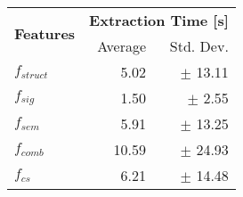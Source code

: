 \begin{tabular}{@{}lrr@{}}
\toprule
\multirow{2}{*}{\textbf{Features}} & \multicolumn{2}{c}{\textbf{Extraction Time [s]}} \\
\cmidrule{2-3}
 & Average & Std. Dev. \\ 
\midrule
$f_{struct}$ & 5.02 & $\pm$ 13.11 \\
$f_{sig}$ & 1.50 & $\pm$ 2.55 \\
$f_{sem}$ & 5.91 & $\pm$ 13.25 \\
$f_{comb}$ & 10.59 & $\pm$ 24.93  \\
$f_{cs}$ & 6.21 & $\pm$ 14.48  \\
\bottomrule
\end{tabular}